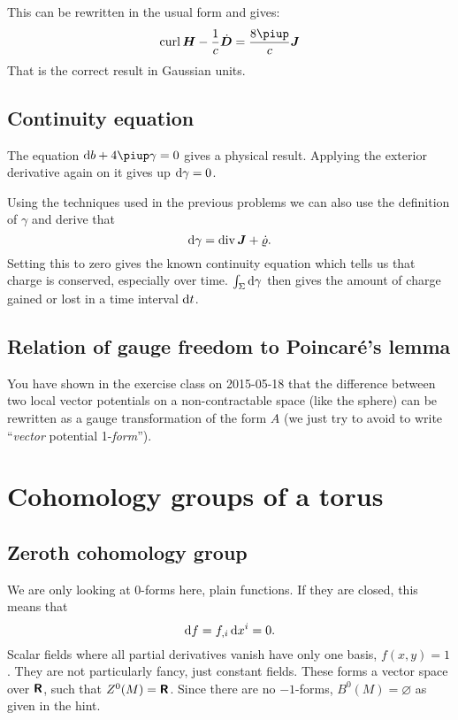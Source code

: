 \documentclass[11pt, english, fleqn, DIV=15, headinclude, BCOR=1cm]{scrartcl}
\begin{document}
This can be rewritten in the usual form and gives:
\[
    \curl \vec H - \frac 1c \dot{\vec D} = \frac{8\piup}{c} \vec J
\]
That is the correct result in Gaussian units.

\subsection{Continuity equation}

The equation $\dif b + 4 \piup \gamma = 0$ gives a physical result. Applying
the exterior derivative again on it gives up $\mathop{}\!\mathrm d \gamma = 0$.

Using the techniques used in the previous problems we can also use the
definition of $\gamma$ and derive that
\[
    \mathop{}\!\mathrm d \gamma = \operatorname{div} \boldsymbol{J} + \dot\varrho.
\]
Setting this to zero gives the known continuity equation which tells us that
charge is conserved, especially over time. $\int_\Sigma \mathop{}\!\mathrm d \gamma$ then gives
the amount of charge gained or lost in a time interval $\mathop{}\!\mathrm d t$.

\subsection{Relation of gauge freedom to Poincaré's lemma}

You have shown in the exercise class on 2015-05-18 that the difference between
two local vector potentials on a non-contractable space (like the sphere) can
be rewritten as a gauge transformation of the form $A$ (we just try to avoid to
write “\emph{vector} potential 1-\emph{form}”).


\section{Cohomology groups of a torus}
\label{homework:2}

\subsection{Zeroth cohomology group}

We are only looking at 0-forms here, plain functions. If they are closed, this
means that
\[
    \mathop{}\!\mathrm d f = f_{,i} \mathop{}\!\mathrm d x^i = 0.
\]
Scalar fields where all partial derivatives vanish have only one basis, $f(x,
y) = 1$. They are not particularly fancy, just constant fields. These forms a
vector space over $\text{\bfseries\sffamily R}$, such that $Z^0(M) = \text{\bfseries\sffamily R}$. Since there are no $-1$-forms,
$B^0(M) = \varnothing$ as given in the hint.
\end{document}

